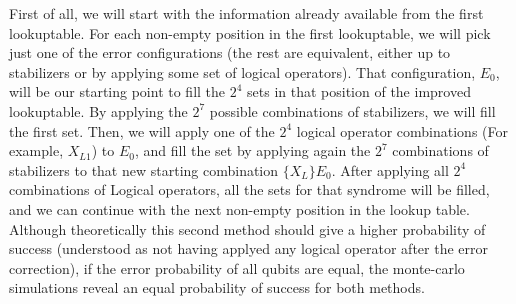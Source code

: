 \documentclass[a4paper,12pt]{article}
\begin{document}
First of all, we will start with the information already available from the first lookuptable. For each non-empty position in the first lookuptable, we will pick just one of the error configurations (the rest are equivalent, either up to stabilizers or by applying some set of logical operators). That configuration, $E_0$, will be our starting point to fill the $2^4$ sets in that position of the improved lookuptable. By applying the $2^7$ possible combinations of stabilizers, we will fill the first set. Then, we will apply one of the $2^4$ logical operator combinations (For example, $X_{L1}$) to $E_0$, and fill the set by applying again the $2^7$ combinations of stabilizers to that new starting combination $\{X_L\}E_0$. After applying all $2^4$ combinations of Logical operators, all the sets for that syndrome will be filled, and we can continue with the next non-empty position in the lookup table.\\

Although theoretically this second method should give a higher probability of success (understood as not having applyed any logical operator after the error correction), if the error probability of all qubits are equal, the monte-carlo simulations reveal an equal probability of success for both methods.


%




\end{document}
